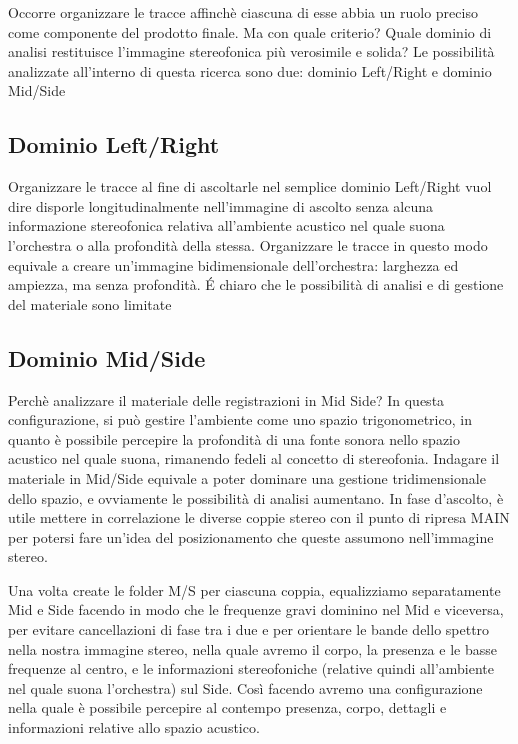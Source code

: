 Occorre organizzare le tracce affinchè ciascuna di esse abbia un ruolo preciso come componente del prodotto finale. Ma con quale criterio? Quale dominio di analisi restituisce l'immagine stereofonica più verosimile e solida? Le possibilità analizzate all'interno di questa ricerca sono due: dominio Left/Right e dominio Mid/Side

\subsection*{Dominio Left/Right}
Organizzare le tracce al fine di ascoltarle nel semplice dominio Left/Right vuol dire disporle longitudinalmente nell'immagine di ascolto senza alcuna informazione stereofonica relativa all'ambiente acustico nel quale suona l'orchestra o alla profondità della stessa.
Organizzare le tracce in questo modo equivale a creare un'immagine bidimensionale dell'orchestra: larghezza ed ampiezza, ma senza profondità.
É chiaro che le possibilità di analisi e di gestione del materiale sono limitate

\subsection*{Dominio Mid/Side}
Perchè analizzare il materiale delle registrazioni in Mid Side?
In questa configurazione, si può gestire l'ambiente come uno spazio trigonometrico, in quanto è possibile percepire la profondità di una fonte sonora nello spazio acustico nel quale suona, rimanendo fedeli al concetto di stereofonia.
Indagare il materiale in Mid/Side equivale a poter dominare una gestione tridimensionale dello spazio, e ovviamente le possibilità di analisi aumentano.
In fase d'ascolto, è utile mettere in correlazione le diverse coppie stereo con il punto di ripresa MAIN per potersi fare un'idea del posizionamento che  queste assumono nell'immagine stereo.

Una volta create le folder M/S per ciascuna coppia, equalizziamo separatamente Mid e Side facendo in modo che le frequenze gravi dominino nel Mid e viceversa, per evitare cancellazioni di fase tra i due e per orientare le bande dello spettro nella nostra immagine stereo, nella quale avremo il corpo, la presenza e le basse frequenze al centro, e le informazioni stereofoniche (relative quindi all'ambiente nel quale suona l'orchestra) sul Side. Così facendo avremo una configurazione nella quale è possibile percepire al contempo presenza, corpo, dettagli e informazioni relative allo spazio acustico.

